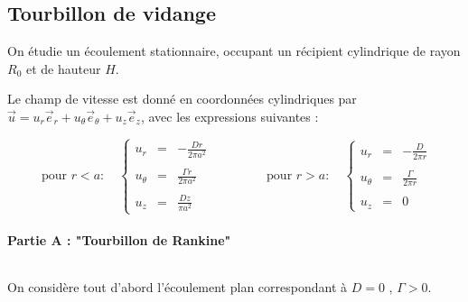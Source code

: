 \subsection{Tourbillon de vidange}


On étudie un écoulement stationnaire,
occupant un récipient cylindrique de rayon $R_0$ et de hauteur $H$.
 
Le champ de vitesse est donné en coordonnées cylindriques
par $\vec u = u_r \vec e_r + u_\theta \vec e_\theta  + u_z \vec e_z$,
avec les expressions suivantes :

$$
\mbox{ pour } r<a : \quad 
\left\{ 
\begin{array}{lcr}
u_r &=& \displaystyle - \frac{Dr}{2 \pi a^2}\\ \\
u_\theta &=& \displaystyle \frac{\Gamma r }{2 \pi a^2}\\ \\
u_z&=& \displaystyle \frac{D z}{\pi a^2}  
\end{array}
\right. 
\qquad  \qquad
\mbox{ pour } r>a :
\quad
\left\{ 
\begin{array}{lcr}
u_r &=& - \displaystyle \frac{D}{2 \pi r}\\ 
\\
u_\theta &=& \displaystyle \frac{\Gamma}{2 \pi r}\\
\\
u_z&=& 0  
\end{array}
\right. 
$$
 
\paragraph{Partie A :  "Tourbillon de Rankine" }  $ \, $

On considère tout d'abord l'écoulement plan correspondant à $D = 0$ , $\Gamma > 0$.



